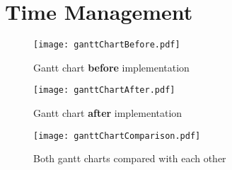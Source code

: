 \section{Time Management}
\begin{figure}[ht]
	\centering
	\texttt{[image: ganttChartBefore.pdf]}
	\caption{Gantt chart \textbf{before} implementation}
	\label{img:ganttChartBefore}
\end{figure}
\begin{figure}[ht]
	\centering
	\texttt{[image: ganttChartAfter.pdf]}
	\caption{Gantt chart \textbf{after} implementation}
	\label{img:ganttChartAfter}
\end{figure}
\begin{figure}[ht]
	\centering
	\texttt{[image: ganttChartComparison.pdf]}
	\caption{Both gantt charts compared with each other}
	\label{img:ganttChartCompared}
\end{figure}